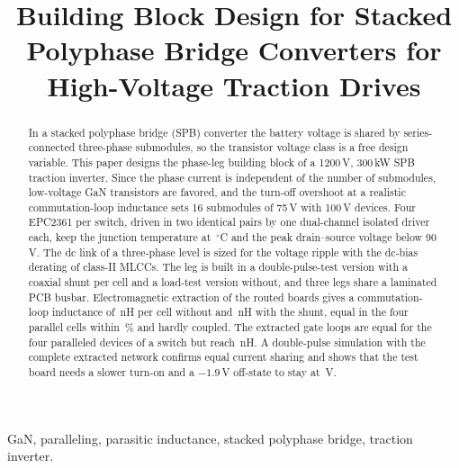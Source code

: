 \documentclass[conference]{IEEEtran}
\begin{document}
\title{Building Block Design for Stacked Polyphase Bridge Converters for High-Voltage Traction Drives}

\author{
}

\maketitle

\begin{abstract}
In a stacked polyphase bridge (SPB) converter the battery voltage is shared by series-connected three-phase submodules, so the transistor voltage class is a free design variable. This paper designs the phase-leg building block of a 1200\,V, 300\,kW SPB traction inverter. Since the phase current is independent of the number of submodules, low-voltage GaN transistors are favored, and the turn-off overshoot at a realistic commutation-loop inductance sets 16 submodules of 75\,V with 100\,V devices. Four EPC2361 per switch, driven in two identical pairs by one dual-channel isolated driver each, keep the junction temperature at \TjFour\,$^\circ$C and the peak drain--source voltage below 90\,V. The dc link of a three-phase level is sized for the voltage ripple with the dc-bias derating of class-II MLCCs. The leg is built in a double-pulse-test version with a coaxial shunt per cell and a load-test version without, and three legs share a laminated PCB busbar. Electromagnetic extraction of the routed boards gives a commutation-loop inductance of \LoopLoad\,nH per cell without and \LoopDpt\,nH with the shunt, equal in the four parallel cells within \LoopDptSpread\,\% and hardly coupled. The extracted gate loops are equal for the four paralleled devices of a switch but reach \GatePairHS\,nH. A double-pulse simulation with the complete extracted network confirms equal current sharing and shows that the test board needs a slower turn-on and a $-1.9$\,V off-state to stay at \QsVhDpt\,V.
\end{abstract}

\begin{IEEEkeywords}
GaN, paralleling, parasitic inductance, stacked polyphase bridge, traction inverter.
\end{IEEEkeywords}

\end{document}
